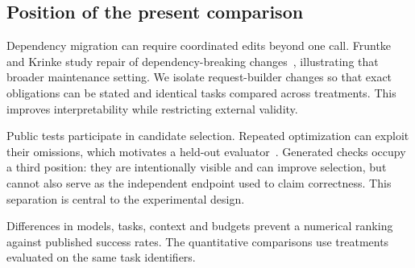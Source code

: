 \ifAccess
\subsection{Position of the present comparison}
Dependency migration can require coordinated edits beyond one call. Fruntke and Krinke study repair of dependency-breaking changes~\cite{dependency2025}, illustrating that broader maintenance setting. We isolate request-builder changes so that exact obligations can be stated and identical tasks compared across treatments. This improves interpretability while restricting external validity.

Public tests participate in candidate selection. Repeated optimization can exploit their omissions, which motivates a held-out evaluator~\cite{plausibility2015}. Generated checks occupy a third position: they are intentionally visible and can improve selection, but cannot also serve as the independent endpoint used to claim correctness. This separation is central to the experimental design.

Differences in models, tasks, context and budgets prevent a numerical ranking against published success rates. The quantitative comparisons use treatments evaluated on the same task identifiers.
\fi
